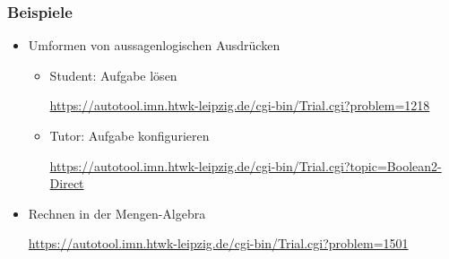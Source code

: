\begin{frame}\frametitle{Beispiele}
  \begin{itemize}
  \item Umformen von aussagenlogischen Ausdrücken
    \begin{itemize}
    \item Student: Aufgabe lösen

    \url{https://autotool.imn.htwk-leipzig.de/cgi-bin/Trial.cgi?problem=1218}
  \item Tutor: Aufgabe konfigurieren

    \url{https://autotool.imn.htwk-leipzig.de/cgi-bin/Trial.cgi?topic=Boolean2-Direct}
    \end{itemize}
  \item Rechnen in der Mengen-Algebra

    \url{https://autotool.imn.htwk-leipzig.de/cgi-bin/Trial.cgi?problem=1501}

  \end{itemize}


\end{frame}
